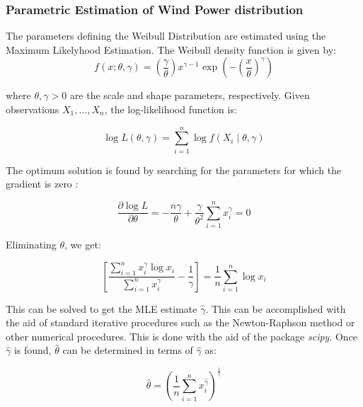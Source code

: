 \documentclass[english]{article}
\numberwithin{definition}{section}
\numberwithin{theorem}{section}
\numberwithin{problem}{section}
\begin{document}
\subsubsection{Parametric Estimation of Wind Power distribution}
\label{subsection: weib estim}
The parameters defining the Weibull Distribution are estimated using the Maximum Likelyhood Estimation. The Weibull density function is given by:
\[
f(x; \theta, \gamma) = \left(\frac{\gamma}{\theta}\right)x^{\gamma-1}\exp\left(-\left(\frac{x}{\theta}\right)^\gamma\right)
\]

where \(\theta, \gamma > 0\) are the scale and shape parameters, respectively. Given observations \(X_1, \ldots, X_n\), the log-likelihood function is:

\[
\log L(\theta, \gamma) = \sum_{i=1}^n \log f(X_i \mid \theta, \gamma)
\]

The optimum solution is found by searching for the parameters for which the gradient is zero :

\begin{equation}
\frac{\partial \log L}{\partial \theta} = -\frac{n \gamma}{\theta} + \frac{\gamma}{\theta^2} \sum_{i=1}^{n} x_i^\gamma = 0
\end{equation}

Eliminating $\theta$, we get:

\begin{equation}
\left[ \frac{\sum_{i=1}^{n} x_i^\gamma \log x_i}{\sum_{i=1}^{n} x_i^\gamma} - \frac{1}{\gamma} \right] = \frac{1}{n} \sum_{i=1}^{n} \log x_i
\end{equation}

This can be solved to get the MLE estimate $\hat{\gamma}$. This can be accomplished with the aid of standard iterative procedures such as the Newton-Raphson method or other numerical procedures. This is done with the aid of the package \emph{scipy}. Once $\hat{\gamma}$ is found, $\hat{\theta}$ can be determined in terms of $\hat{\gamma}$ as:

\begin{equation}
\hat{\theta} = \left( \frac{1}{n} \sum_{i=1}^{n} x_i^{\hat{\gamma}} \right)^{\frac{1}{\hat{\gamma}}}
\end{equation}
\end{document}
